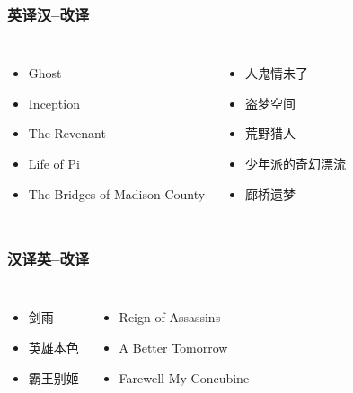 \documentclass[xcolor=x11names,compress]{ctexbeamer}
\begin{document}
\begin{frame}
\frametitle{英译汉--改译}
\begin{columns}

\begin{itemize}
\item Ghost
\item Inception
\item The Revenant
\item Life of Pi
\item The Bridges of Madison County
\end{itemize}
\pause
{}
\begin{itemize}
\item 人鬼情未了
\item 盗梦空间
\item 荒野猎人
\item 少年派的奇幻漂流
\item 廊桥遗梦
\end{itemize}
\end{columns}
\end{frame}







\begin{frame}[fragile]
\frametitle{汉译英--改译}
\begin{columns}

\begin{itemize}
\item 剑雨
\item 英雄本色
\item 霸王别姬

\end{itemize}
\pause
{}
\begin{itemize}
\item Reign of Assassins
\item A Better Tomorrow
\item Farewell My Concubine
 
\end{itemize}
\end{columns}
\end{frame}
\end{document}
